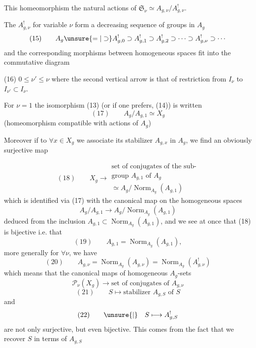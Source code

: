 This homeomorphism  the natural
actions of $\mathfrak S_\nu\simeq A_{g,\nu}/A_{g,\nu}^!$.

The $A_{g,\nu}^!$ for variable $\nu$ form a
decreasing sequence of groups in $A_g$
\[
(15)\qquad A_g\unsure{=|\supset}A_{g,0}^!\supset A_{g,1}^!\supset A_{g,2}^!
\supset\cdots\supset A_{g,\nu}^!\supset\cdots
\]
and the corresponding morphisms
between homogeneous spaces  fit into the
commutative diagram  

(16)\quad
{}
\quad $0\leq\nu'\leq\nu$
where the second vertical arrow is that of
restriction from $I_\nu$ to $I_{\nu'}\subset I_\nu$.

For $\nu=1$  the isomorphism (13) (or if one prefers,
(14)) is written
\[
(17)\qquad A_g/A_{g,1}\simeq X_g
\]
(homeomorphism compatible with  actions of $A_g$)

Moreover if to $\forall x\in X_g$ we associate its
stabilizer $A_{g,x}$ in $A_g$, we find an
obviously surjective map

\[
(18)\qquad X_g\longrightarrow
\begin{gathered}
\text{set of conjugates of the sub-}\\
\text{group }A_{g,1}\text{ of }A_g\\
\simeq A_g/\operatorname{Norm}_{A_g}(A_{g,1})
\end{gathered}
\]
which is identified via (17) with the canonical map
on the homogeneous spaces
\[
 A_g/A_{g,1}\longrightarrow A_g/\operatorname{Norm}_{A_g}(A_{g,1})
\]
deduced from the inclusion $A_{g,1}\subset\operatorname{Norm}_{A_g}(A_{g,1})$,
and we see at once that (18) is
bijective i.e. that 
\[
(19)\qquad A_{g,1}=\operatorname{Norm}_{A_g}(A_{g,1}),
\]
more generally for $\forall\nu$, we have
\[
(20)\qquad A_{g,\nu}=\operatorname{Norm}_{A_g}(A_{g,\nu})
=\operatorname{Norm}_{A_g}(A_{g,\nu}^!)
\]
which means that the canonical maps
of homogeneous $A_g$-sets
\[
\mathcal P_\nu(X_g)\longrightarrow\text{set of conjugates of }A_{g,\nu}
\]
\[
(21)\qquad S\longmapsto\text{stabilizer }A_{g,S}\text{ of }S
\]
and
\[
(22)\qquad\unsure{\vert}\quad S\longmapsto A_{g,S}^!
\]
are not only surjective, but even bijective.
This comes from the fact that we recover
$S$ in terms of $A_{g,S}$\deleted{${}^!$} 
  

